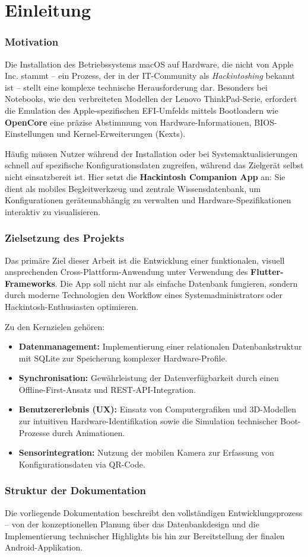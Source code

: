 \chapter{Einleitung}
\label{chap:einleitung}

\subsection{Motivation}
Die Installation des Betriebssystems macOS auf Hardware, die nicht von Apple Inc. stammt – ein Prozess, der in der IT-Community als \textit{Hackintoshing} bekannt ist – stellt eine komplexe technische Herausforderung dar. Besonders bei Notebooks, wie den verbreiteten Modellen der Lenovo ThinkPad-Serie, erfordert die Emulation des Apple-spezifischen EFI-Umfelds mittels Bootloadern wie \textbf{OpenCore} eine präzise Abstimmung von Hardware-Informationen, BIOS-Einstellungen und Kernel-Erweiterungen (Kexts).

Häufig müssen Nutzer während der Installation oder bei Systemaktualisierungen schnell auf spezifische Konfigurationsdaten zugreifen, während das Zielgerät selbst nicht einsatzbereit ist. Hier setzt die \textbf{Hackintosh Companion App} an: Sie dient als mobiles Begleitwerkzeug und zentrale Wissensdatenbank, um Konfigurationen geräteunabhängig zu verwalten und Hardware-Spezifikationen interaktiv zu visualisieren.

\subsection{Zielsetzung des Projekts}
Das primäre Ziel dieser Arbeit ist die Entwicklung einer funktionalen, visuell ansprechenden Cross-Plattform-Anwendung unter Verwendung des \textbf{Flutter-Frameworks}. Die App soll nicht nur als einfache Datenbank fungieren, sondern durch moderne Technologien den Workflow eines Systemadministrators oder Hackintosh-Enthusiasten optimieren. 

Zu den Kernzielen gehören:
\begin{itemize}
    \item \textbf{Datenmanagement:} Implementierung einer relationalen Datenbankstruktur mit SQLite zur Speicherung komplexer Hardware-Profile.
    \item \textbf{Synchronisation:} Gewährleistung der Datenverfügbarkeit durch einen Offline-First-Ansatz und REST-API-Integration.
    \item \textbf{Benutzererlebnis (UX):} Einsatz von Computergrafiken und 3D-Modellen zur intuitiven Hardware-Identifikation sowie die Simulation technischer Boot-Prozesse durch Animationen.
    \item \textbf{Sensorintegration:} Nutzung der mobilen Kamera zur Erfassung von Konfigurationsdaten via QR-Code.
\end{itemize}

\subsection{Struktur der Dokumentation}
Die vorliegende Dokumentation beschreibt den vollständigen Entwicklungsprozess – von der konzeptionellen Planung über das Datenbankdesign und die Implementierung technischer Highlights bis hin zur Bereitstellung der finalen Android-Applikation.